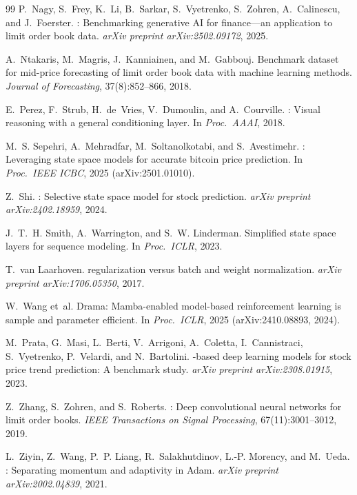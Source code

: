 \documentclass{article}
\begin{document}
\begin{thebibliography}{99}
P.~Nagy, S.~Frey, K.~Li, B.~Sarkar, S.~Vyetrenko, S.~Zohren, A.~Calinescu, and J.~Foerster.
: Benchmarking generative {AI} for finance---an application to limit order book data.
\newblock \emph{arXiv preprint arXiv:2502.09172}, 2025.

A.~Ntakaris, M.~Magris, J.~Kanniainen, and M.~Gabbouj.
\newblock Benchmark dataset for mid-price forecasting of limit order book data with machine learning methods.
\newblock \emph{Journal of Forecasting}, 37(8):852--866, 2018.

E.~Perez, F.~Strub, H.~de~Vries, V.~Dumoulin, and A.~Courville.
: Visual reasoning with a general conditioning layer.
\newblock In \emph{Proc.\ AAAI}, 2018.

M.~S. Sepehri, A.~Mehradfar, M.~Soltanolkotabi, and S.~Avestimehr.
: Leveraging state space models for accurate bitcoin price prediction.
\newblock In \emph{Proc.\ IEEE ICBC}, 2025 (arXiv:2501.01010).

Z.~Shi.
: Selective state space model for stock prediction.
\newblock \emph{arXiv preprint arXiv:2402.18959}, 2024.

J.~T.~H. Smith, A.~Warrington, and S.~W. Linderman.
\newblock Simplified state space layers for sequence modeling.
\newblock In \emph{Proc.\ ICLR}, 2023.

T.~van Laarhoven.
 regularization versus batch and weight normalization.
\newblock \emph{arXiv preprint arXiv:1706.05350}, 2017.

W.~Wang et~al.
\newblock Drama: Mamba-enabled model-based reinforcement learning is sample and parameter efficient.
\newblock In \emph{Proc.\ ICLR}, 2025 (arXiv:2410.08893, 2024).

M.~Prata, G.~Masi, L.~Berti, V.~Arrigoni, A.~Coletta, I.~Cannistraci, S.~Vyetrenko, P.~Velardi, and N.~Bartolini.
-based deep learning models for stock price trend prediction: A benchmark study.
\newblock \emph{arXiv preprint arXiv:2308.01915}, 2023.

Z.~Zhang, S.~Zohren, and S.~Roberts.
: Deep convolutional neural networks for limit order books.
\newblock \emph{IEEE Transactions on Signal Processing}, 67(11):3001--3012, 2019.

L.~Ziyin, Z.~Wang, P.~P. Liang, R.~Salakhutdinov, L.-P. Morency, and M.~Ueda.
: Separating momentum and adaptivity in Adam.
\newblock \emph{arXiv preprint arXiv:2002.04839}, 2021.

\end{thebibliography}
\end{document}
